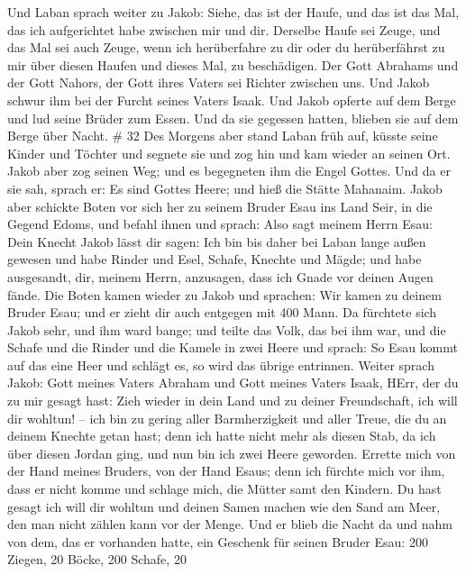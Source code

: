  Und Laban sprach weiter zu Jakob: Siehe, das ist der
Haufe, und das ist das Mal, das ich aufgerichtet habe zwischen mir und
dir.  Derselbe Haufe sei Zeuge, und das Mal sei auch Zeuge,
wenn ich herüberfahre zu dir oder du herüberfährst zu mir über diesen
Haufen und dieses Mal, zu beschädigen.  Der Gott Abrahams
und der Gott Nahors, der Gott ihres Vaters sei Richter zwischen uns.
 Und Jakob schwur ihm bei der Furcht seines Vaters Isaak.
Und Jakob opferte auf dem Berge und lud seine Brüder zum Essen. Und da
sie gegessen hatten, blieben sie auf dem Berge über Nacht. \# 32
 Des Morgens aber stand Laban früh auf, küsste seine Kinder
und Töchter und segnete sie und zog hin und kam wieder an seinen Ort.
 Jakob aber zog seinen Weg; und es begegneten ihm die Engel
Gottes.  Und da er sie sah, sprach er: Es sind Gottes Heere;
und hieß die Stätte Mahanaim.  Jakob aber schickte Boten vor
sich her zu seinem Bruder Esau ins Land Seir, in die Gegend Edoms,
 und befahl ihnen und sprach: Also sagt meinem Herrn Esau:
Dein Knecht Jakob lässt dir sagen: Ich bin bis daher bei Laban lange
außen gewesen  und habe Rinder und Esel, Schafe, Knechte und
Mägde; und habe ausgesandt, dir, meinem Herrn, anzusagen, dass ich Gnade
vor deinen Augen fände.  Die Boten kamen wieder zu Jakob und
sprachen: Wir kamen zu deinem Bruder Esau; und er zieht dir auch
entgegen mit 400 Mann.  Da fürchtete sich Jakob sehr, und
ihm ward bange; und teilte das Volk, das bei ihm war, und die Schafe und
die Rinder und die Kamele in zwei Heere  und sprach: So Esau
kommt auf das eine Heer und schlägt es, so wird das übrige entrinnen.
 Weiter sprach Jakob: Gott meines Vaters Abraham und Gott
meines Vaters Isaak, HErr, der du zu mir gesagt hast: Zieh wieder in
dein Land und zu deiner Freundschaft, ich will dir wohltun! --
 ich bin zu gering aller Barmherzigkeit und aller Treue,
die du an deinem Knechte getan hast; denn ich hatte nicht mehr als
diesen Stab, da ich über diesen Jordan ging, und nun bin ich zwei Heere
geworden.  Errette mich von der Hand meines Bruders, von
der Hand Esaus; denn ich fürchte mich vor ihm, dass er nicht komme und
schlage mich, die Mütter samt den Kindern.  Du hast gesagt
ich will dir wohltun und deinen Samen machen wie den Sand am Meer, den
man nicht zählen kann vor der Menge.  Und er blieb die
Nacht da und nahm von dem, das er vorhanden hatte, ein Geschenk für
seinen Bruder Esau:  200 Ziegen, 20 Böcke, 200 Schafe, 20
